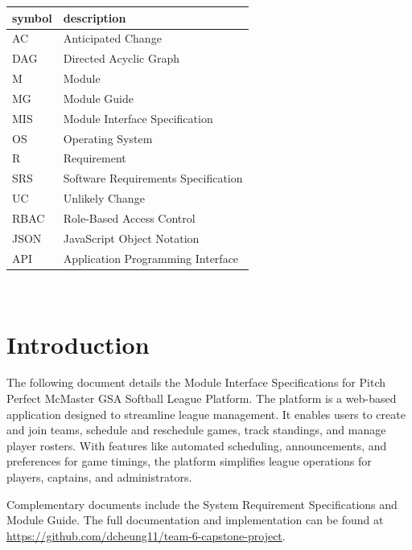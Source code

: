 \documentclass[12pt, titlepage]{article}
\begin{document}
\renewcommand{\arraystretch}{1.2}
\begin{tabular}{l l}
  \toprule
  \textbf{symbol} & \textbf{description}                \\
  \midrule
  AC              & Anticipated Change                  \\
  DAG             & Directed Acyclic Graph              \\
  M               & Module                              \\
  MG              & Module Guide                        \\
  MIS             & Module Interface Specification      \\
  OS              & Operating System                    \\
  R               & Requirement                         \\
  SRS             & Software Requirements Specification \\
  UC              & Unlikely Change                     \\
  RBAC            & Role-Based Access Control           \\
  JSON            & JavaScript Object Notation          \\
  API             & Application Programming Interface   \\
  \bottomrule
\end{tabular}\\

\newpage

\tableofcontents

\newpage


\section{Introduction}

The following document details the Module Interface Specifications for
Pitch Perfect McMaster GSA Softball League Platform. The platform is a web-based application designed to streamline league management. It enables users to create and join teams, schedule and reschedule games, track standings, and manage player rosters. With features like automated scheduling, announcements, and preferences for game timings, the platform simplifies league operations for players, captains, and administrators.

Complementary documents include the System Requirement Specifications
and Module Guide.  The full documentation and implementation can be
found at \url{https://github.com/dcheung11/team-6-capstone-project}.
\end{document}
